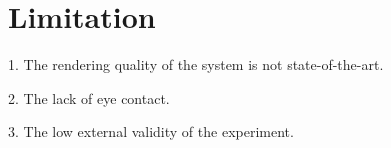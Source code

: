 \section{Limitation}

1. The rendering quality of the system is not state-of-the-art.

2. The lack of eye contact.

3. The low external validity of the experiment.
